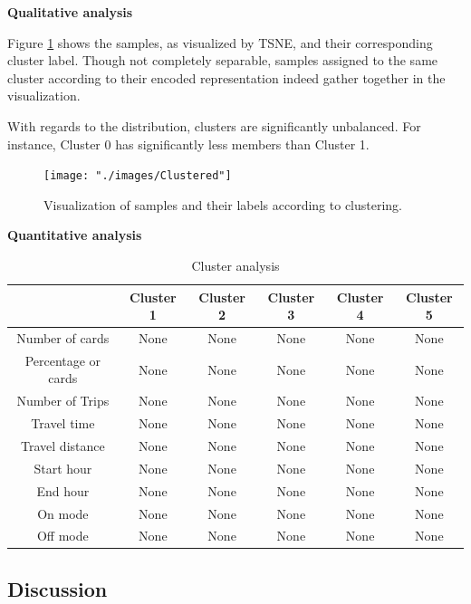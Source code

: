 \documentclass{article}
\begin{document}
\textbf{Qualitative analysis}


Figure \ref{fig:clustering/tsne} shows the samples, as visualized by TSNE, and their corresponding cluster label. Though not completely separable, samples assigned to the same cluster according to their encoded representation indeed gather together in the visualization. 

With regards to the distribution, clusters are significantly unbalanced. For instance, Cluster 0 has significantly less members than Cluster 1.

\begin{figure}[H]
  \centering
  \texttt{[image: "./images/Clustered"]}
  \caption{Visualization of samples and their labels according to clustering.}
  \label{fig:clustering/tsne}
\end{figure}

\textbf{Quantitative analysis}

\begin{table}[H]
\centering
\begin{tabular}{||c|c|c|c|c|c||}
\hline
 & \textbf{Cluster 1} & \textbf{Cluster 2} & \textbf{Cluster 3} & \textbf{Cluster 4} & \textbf{Cluster 5} \\
[0.5ex] 
\hline \hline
Number of cards & None & None & None & None  & None \\
Percentage or cards & None & None & None & None  & None \\
\hline
Number of Trips & None & None & None & None  & None \\
Travel time & None & None & None & None  & None \\
Travel distance & None & None & None & None  & None \\
\hline
Start hour & None & None & None & None  & None \\
End hour & None & None & None & None  & None \\
\hline
On mode & None & None & None & None  & None \\ %
Off mode & None & None & None & None  & None \\ [1ex]
\hline 
\end{tabular}
\caption{Cluster analysis}
\label{table:clusterAnalysis}
\end{table}




\subsection{Discussion}
\end{document}
